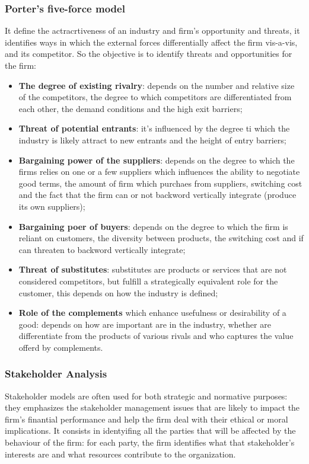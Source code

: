 \documentclass[12pt]{article}
\begin{document}
\subsubsection{Porter's five-force model}
It define the actracrtiveness of an industry and firm's opportunity and threats, it identifies ways in which the external forces differentially affect the firm vis-a-vis, and its competitor.
So the objective is to identify threats and opportunities for the firm:
\begin{itemize}
    \item \textbf{The degree of existing rivalry}: depends on the number and relative size of the competitors, the degree to which competitors are differentiated from each other, the demand conditions and the high exit barriers;
    \item \textbf{Threat of potential entrants}: it's influenced by the degree ti which the industry is likely attract to new entrants and the height of entry barriers;
    \item \textbf{Bargaining power of the suppliers}: depends on the degree to which the firms relies on one or a few suppliers which influences the ability to negotiate good terms, the amount of firm which purchaes from suppliers, switching cost and the fact that the firm can or not backword vertically integrate (produce its own suppliers);
    \item \textbf{Bargaining poer of buyers}: depends on the degree to which the firm is reliant on customers, the diversity between products, the switching cost and if can threaten to backword vertically integrate; 
    \item \textbf{Threat of substitutes}: substitutes are products or services that are not considered competitors, but fulfill a strategically equivalent role for the customer, this depends on how the industry is defined;
    \item \textbf{Role of the complements} which enhance usefulness or desirability of a good: depends on how are important are in the industry, whether are differentiate from the products of various rivals and who captures the value offerd by complements. 
\end{itemize}
\subsubsection{Stakeholder Analysis}
Stakeholder models are often used for both strategic and normative purposes: they emphasizes the stakeholder management issues that are likely to impact the firm's finantial performance and help the firm deal with their ethical or moral implications.
It consists in identyifing all the parties that will be affected by the behaviour of the firm: for each party, the firm identifies what that stakeholder's interests are and what resources contribute to the organization.
\end{document}
